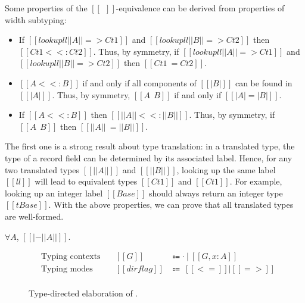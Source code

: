 \begin{lemma}\label{thm:trans}
  Some properties of the $[[~~]]$-equivalence can be derived from properties of width subtyping:
  \begin{itemize}
  \item If $[[lookup ll ||A|| => Ct1]]$ and $[[lookup ll ||B|| => Ct2]]$
    then $[[Ct1 <<: Ct2]]$.
    Thus, by symmetry, if $[[lookup ll ||A|| => Ct1]]$ and $[[lookup ll ||B|| => Ct2]]$
    then $[[Ct1 ~= Ct2]]$.
  \item $[[A <<: B]]$ if and only if all components of $[[| B |]]$ can be found in $[[| A |]]$.
    Thus, by symmetry, $[[A ~~ B]]$ if and only if  $[[| A | = | B |]]$.
  \item If $[[A <<: B]]$ then $[[|| A || <<: || B ||]]$. Thus, by symmetry,
    if $[[A ~~ B]]$ then $[[|| A || ~= || B ||]]$.
  \end{itemize}
\end{lemma}

\noindent
The first one is a strong result about type translation: in a translated type,
the type of a record field can be determined by its associated label. Hence, for
any two translated types $[[||A||]]$ and $[[||B||]]$, looking up the same label
$[[ll]]$ will lead to equivalent types $[[Ct1]]$ and $[[Ct1]]$. For example,
looking up an integer label $[[Base]]$ should always return an integer type
$[[tBase]]$. With the above properties, we can prove that all translated types
are well-formed.

\begin{lemma}\label{thm:wf-trans}
  $\forall A$, $[[ |- ||A|| ]]$.
\end{lemma}

\begin{figure}
  \small
  \begin{align*}
    &\text{Typing contexts} &\quad[[G]] &\Coloneqq \cdot ~|~ [[ G, x:A ]] \\
    &\text{Typing modes} &\quad[[dirflag]] &\Coloneqq~ [[<=]] | [[=>]] \\
  \end{align*}

  \ottdefnsElaboration
  \ottdefnsDistributiveApplication
  \ottdefnsProjection

  \caption{Type-directed elaboration of \lambdaiplus.}
  \label{fig:source-typing}
\end{figure}

